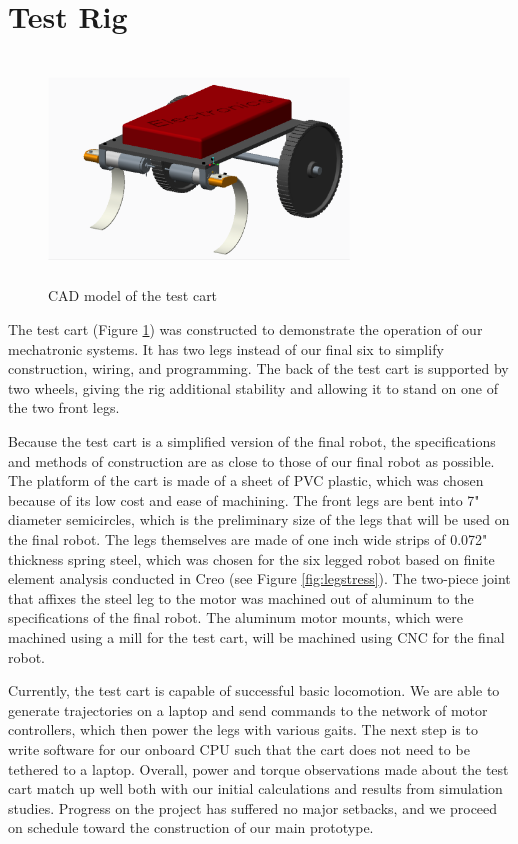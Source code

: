 \documentclass[11pt]{article}
\begin{document}
\section{Test Rig}

\begin{figure}[t]
\centering
\includegraphics[width=8cm,height=6cm]{cad_test_cart.png}
\caption{CAD model of the test cart}
\label{fig:testcart}
\end{figure}

The test cart (Figure \ref{fig:testcart}) was constructed to demonstrate the operation of our mechatronic systems. It has two legs instead of our final six to simplify construction, wiring, and programming. The back of the test cart is supported by two wheels, giving the rig additional stability and allowing it to stand on one of the two front legs.

Because the test cart is a simplified version of the final robot, the specifications and methods of construction are as close to those of our final robot as possible. The platform of the cart is made of a sheet of PVC plastic, which was chosen because of its low cost and ease of machining. The front legs are bent into 7" diameter semicircles, which is the preliminary size of the legs that will be used on the final robot. The legs themselves are made of one inch wide strips of 0.072" thickness spring steel, which was chosen for the six legged robot based on finite element analysis conducted in Creo (see Figure \ref{fig:legstress}). The two-piece joint that affixes the steel leg to the motor was machined out of aluminum to the specifications of the final robot. The aluminum motor mounts, which were machined using a mill for the test cart, will be machined using CNC for the final robot.

Currently, the test cart is capable of successful basic locomotion. We are able to generate trajectories on a laptop and send commands to the network of motor controllers, which then power the legs with various gaits. The next step is to write software for our onboard CPU such that the cart does not need to be tethered to a laptop. Overall, power and torque observations made about the test cart match up well both with our initial calculations and results from simulation studies. Progress on the project has suffered no major setbacks, and we proceed on schedule toward the construction of our main prototype.
\end{document}
